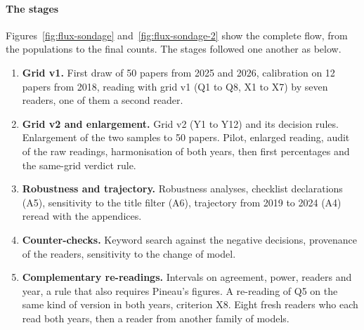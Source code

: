 \paragraph{The stages}
Figures~\ref{fig:flux-sondage} and~\ref{fig:flux-sondage-2} show the complete flow, from the populations to the final counts. The
stages followed one another as below.
\begin{enumerate}
  \item \textbf{Grid v1.} First draw of 50 papers from 2025 and 2026, calibration on 12 papers from
  2018, reading with grid v1 (Q1 to Q8, X1 to X7) by seven readers, one of them a second reader.
  \item \textbf{Grid v2 and enlargement.} Grid v2 (Y1 to Y12) and its decision rules. Enlargement of
  the two samples to 50 papers. Pilot, enlarged reading, audit of the raw readings, harmonisation of
  both years, then first percentages and the same-grid verdict rule.
  \item \textbf{Robustness and trajectory.} Robustness analyses, checklist declarations (A5),
  sensitivity to the title filter (A6), trajectory from 2019 to 2024 (A4) reread with the appendices.
  \item \textbf{Counter-checks.} Keyword search against the negative decisions, provenance of the
  readers, sensitivity to the change of model.
  \item \textbf{Complementary re-readings.} Intervals on agreement, power, readers and year, a rule
  that also requires Pineau's figures. A re-reading of Q5 on the same kind of version in both years,
  criterion X8. Eight fresh readers who each read both years, then a reader from another family of
  models.
\end{enumerate}




